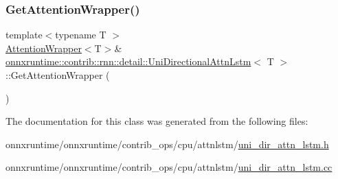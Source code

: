 \subsubsection{\texorpdfstring{Get\+Attention\+Wrapper()}{GetAttentionWrapper()}}
{\footnotesize\ttfamily template$<$typename T $>$ \\
\mbox{\hyperlink{classonnxruntime_1_1contrib_1_1AttentionWrapper}{Attention\+Wrapper}}$<$T$>$\& \mbox{\hyperlink{classonnxruntime_1_1contrib_1_1rnn_1_1detail_1_1UniDirectionalAttnLstm}{onnxruntime\+::contrib\+::rnn\+::detail\+::\+Uni\+Directional\+Attn\+Lstm}}$<$ T $>$\+::Get\+Attention\+Wrapper (\begin{DoxyParamCaption}{ }\end{DoxyParamCaption})\hspace{0.3cm}{\ttfamily [inline]}}



The documentation for this class was generated from the following files\+:\begin{DoxyCompactItemize}
\item 
onnxruntime/onnxruntime/contrib\+\_\+ops/cpu/attnlstm/\mbox{\hyperlink{uni__dir__attn__lstm_8h}{uni\+\_\+dir\+\_\+attn\+\_\+lstm.\+h}}\item 
onnxruntime/onnxruntime/contrib\+\_\+ops/cpu/attnlstm/\mbox{\hyperlink{uni__dir__attn__lstm_8cc}{uni\+\_\+dir\+\_\+attn\+\_\+lstm.\+cc}}\end{DoxyCompactItemize}
